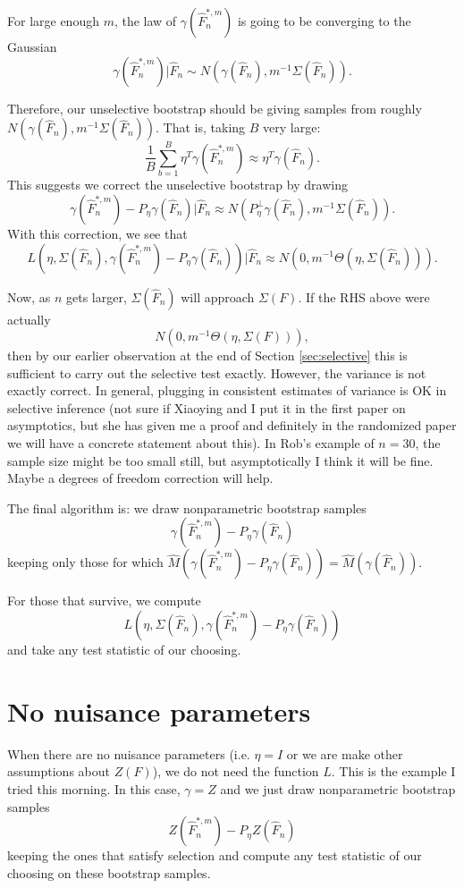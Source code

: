 \documentclass{article}
\begin{document}
For large enough $m$, the law of $\gamma(\hat{F}_n^{*,m})$ is going to be converging
to the Gaussian 
$$
\gamma(\hat{F}_n^{*,m}) | \hat{F}_n \sim N(\gamma(\hat{F}_n), m^{-1} \Sigma(\hat{F}_n)).
$$


Therefore, our unselective bootstrap should be giving samples from
roughly $ N(\gamma(\hat{F}_n), m^{-1} \Sigma(\hat{F}_n))$. That is,
taking $B$ very large:
$$
\frac{1}{B}\sum_{b=1}^B \eta^T \gamma(\hat{F}^{*,m}_n) \approx \eta^T\gamma(\hat{F}_n).
$$
This suggests we correct the unselective bootstrap by drawing
$$
\gamma(\hat{F}^{*,m}_n) - P_{\eta}\gamma(\hat{F}_n) | \hat{F}_n \approx N(P_{\eta}^{\perp}\gamma(\hat{F}_n) ,m^{-1} \Sigma(\hat{F}_n)).
$$
With this correction, we see that
$$
L(\eta, \Sigma(\hat{F}_n), \gamma(\hat{F}^{*,m}_n) - P_{\eta} \gamma(\hat{F}_n)) \big \vert \hat{F}_n
 \approx N(0 ,m^{-1} \Theta(\eta, \Sigma(\hat{F}_n))).
$$

Now, as $n$ gets larger, $\Sigma(\hat{F}_n)$ will approach $\Sigma(F)$. 
If the RHS above were actually $$N(0 ,m^{-1} \Theta(\eta, \Sigma(F))),$$ then
by our earlier observation at the end of Section \ref{sec:selective} this is sufficient to carry out the selective test exactly.
However, the variance is not exactly correct. In general,
plugging in consistent estimates of variance is OK in selective inference (not sure
if Xiaoying and I put it in the first paper on asymptotics, but she has given me a proof and definitely in the
randomized paper we will have a concrete statement about this). In Rob's example of $n=30$, the sample size might be too small still, but asymptotically
I think it will be fine. Maybe a degrees of freedom correction will help.

The final algorithm is:
we draw nonparametric bootstrap samples
$$
\gamma(\hat{F}^{*,m}_n) - P_{\eta}\gamma(\hat{F}_n)
$$
keeping only those for which $\hat{M}(\gamma(\hat{F}^{*,m}_n) - P_{\eta}\gamma(\hat{F}_n)) = \hat{M}(\gamma(\hat{F}_n))$.

For those that survive, we compute
$$
L(\eta, \Sigma(\hat{F}_n), \gamma(\hat{F}^{*,m}_n) - P_{\eta}\gamma(\hat{F}_n))
$$
and take any test statistic of our choosing.

\section{No nuisance parameters}

When there are no nuisance parameters (i.e. $\eta=I$ or we are make other assumptions about $Z(F)$), we do not need the
function $L$. This is the example I tried this morning. In this
case, $\gamma=Z$ and we just draw nonparametric bootstrap samples
$$
Z(\hat{F}^{*,m}_n) - P_{\eta}Z(\hat{F}_n)
$$
keeping the ones that satisfy selection and compute any test statistic of our 
choosing on these bootstrap samples. 
\end{document}
